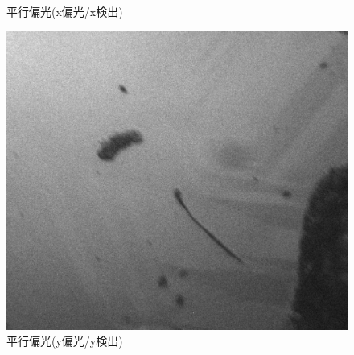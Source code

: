 \documentclass[11pt,a4paper]{jsarticle}
\begin{document}
\begin{figure}[htbp]
\begin{minipage}{0.333\hsize}
\begin{center}
  \end{center}
  \caption{平行偏光(x偏光/x検出)}
  \label{fig:hh250}
 \end{minipage}
 \begin{minipage}{0.333\hsize}
  \begin{center}
   \includegraphics[width=\hsize]{vv250.eps}
  \end{center}
  \caption{平行偏光(y偏光/y検出)}
  \label{fig:vv250}
 \end{minipage}
\end{figure}
\end{document}
